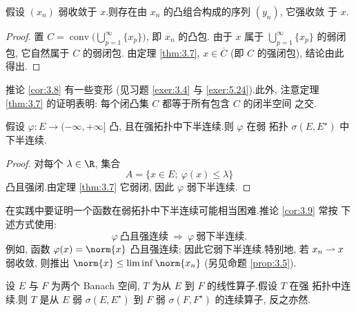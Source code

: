 \begin{corollary}[Mazur]
\label{cor:3.8}
假设 $(x_n)$ 弱收敛于 $x$.则存在由 $x_n$ 的凸组合构成的序列 $(y_n)$, 它强收敛
于 $x$.
\end{corollary}

\begin{proof}
置 $C=\operatorname{conv}\bigl(\bigcup_{p=1}^\infty\{x_p\}\bigr)$, 即 $x_n$ 的凸包.
由于 $x$ 属于 $\bigcup_{p=1}^\infty\{x_p\}$ 的弱闭包, 它自然属于 $C$ 的弱闭包.
由定理  \ref{thm:3.7}, $x\in\overline{C}$ (即 $C$ 的强闭包), 结论由此得出.
\end{proof}

\begin{remark}
\label{rem:3.5}
推论  \ref{cor:3.8} 有一些变形 (见习题  \ref{exer:3.4} 与  \ref{exer:5.24}).此外,
注意定理  \ref{thm:3.7} 的证明表明: 每个闭凸集 $C$ 都等于所有包含 $C$ 的闭半空间
之交.
\end{remark}

\begin{keycorollary}
\label{cor:3.9}
假设 $\varphi:E\to(-\infty,+\infty]$ 凸, 且在强拓扑中下半连续.则 $\varphi$ 在弱
拓扑 $\sigma(E,E^\star)$ 中下半连续.
\end{keycorollary}

\begin{proof}
对每个 $\lambda\in\R$, 集合
\begin{equation*}
A=\{x\in E;\ \varphi(x)\le\lambda\}
\end{equation*}
凸且强闭.由定理  \ref{thm:3.7} 它弱闭, 因此 $\varphi$ 弱下半连续.
\end{proof}

\begin{keyremark}
\label{rem:3.6}
在实践中要证明一个函数在弱拓扑中下半连续可能相当困难.推论  \ref{cor:3.9} 常按
下述方式使用:
\begin{equation*}
\boxed{\varphi\ \text{凸且强连续}\ \Rightarrow\ \varphi\ \text{弱下半连续}.}
\end{equation*}
例如, 函数 $\varphi(x)=\norm{x}$ 凸且强连续; 因此它弱下半连续.特别地, 若
$x_n\rightharpoonup x$ 弱收敛, 则推出 $\norm{x}\le\liminf\norm{x_n}$ (另见命题
 \ref{prop:3.5}).
\end{keyremark}

\begin{theorem}
\label{thm:3.10}
设 $E$ 与 $F$ 为两个 Banach 空间, $T$ 为从 $E$ 到 $F$ 的线性算子.假设 $T$ 在强
拓扑中连续.则 $T$ 是从 $E$ 弱 $\sigma(E,E^\star)$ 到 $F$ 弱 $\sigma(F,F^\star)$
的连续算子, 反之亦然.
\end{theorem}

